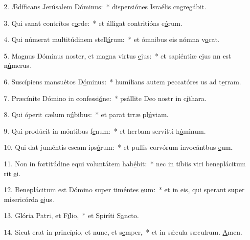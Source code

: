 2. Ædíficans Jerúsalem D\uline{ó}minus:~* dispersiónes Israélis cngreg\uline{á}bit.\par 
3. Qui sanat contrítos c\uline{o}rde:~* et álligat contritións e\uline{ó}rum.\par 
4. Qui númerat multitúdinem stell\uline{á}rum:~* et ómnibus eis nómna v\uline{o}cat.\par 
5. Magnus Dóminus noster, et magna virtus \uline{e}jus:~* et sapiéntiæ ejus nn est n\uline{ú}merus.\par 
6. Suscípiens mansuétos D\uline{ó}minus:~* humílians autem peccatóres us ad t\uline{e}rram.\par 
7. Præcínite Dómino in confessi\uline{ó}ne:~* psállite Deo nostr in c\uline{í}thara.\par 
8. Qui óperit cælum n\uline{ú}bibus:~* et parat trræ pl\uline{ú}viam.\par 
9. Qui prodúcit in móntibus f\uline{e}num:~* et herbam servitti h\uline{ó}minum.\par 
10. Qui dat juméntis escam ips\uline{ó}rum:~* et pullis corvórum invocántbus \uline{e}um.\par 
11. Non in fortitúdine equi voluntátem hab\uline{é}bit:~* nec in tíbiis viri beneplácitum rit \uline{e}i.\par 
12. Beneplácitum est Dómino super timéntes \uline{e}um:~* et in eis, qui sperant super misericórda \uline{e}jus.\par 
13. Glória Patri, et F\uline{í}lio,~* et Spiríti S\uline{a}ncto.\par 
14. Sicut erat in princípio, et nunc, et s\uline{e}mper,~* et in sǽcula sæculrum. \uline{A}men.\par 
